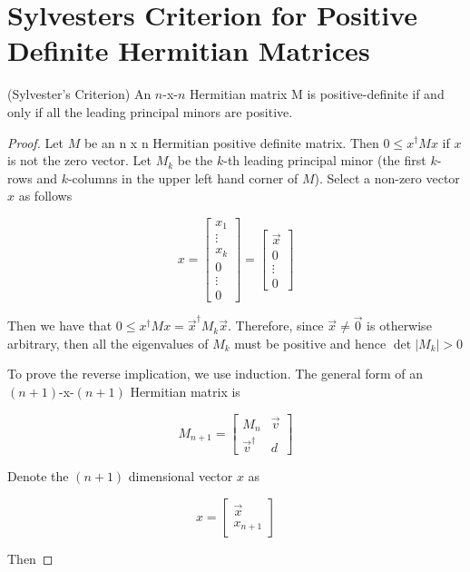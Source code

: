 \section{Sylvesters Criterion for Positive Definite Hermitian Matrices}

\begin{theorem} (Sylvester's Criterion)  An $n$-x-$n$ Hermitian matrix M is positive-definite if and only if all the leading principal minors are positive. 
\end{theorem}

\begin{proof}
Let $M$ be an n x n Hermitian positive definite matrix. Then $0 \le x^\dagger M x$ if $x$ is not the zero vector. Let $M_k$ be the $k$-th leading principal minor 
(the first $k$-rows and $k$-columns in the upper left hand corner of $M$). Select a non-zero vector $x$ as follows 

\[ x = 
\begin{bmatrix}
x_1 \\
\vdots \\
x_k\\
0\\
\vdots\\
0
\end{bmatrix}
= 
\begin{bmatrix}
\vec{x}\\
0\\
\vdots\\
0
\end{bmatrix}
\]

Then we have that $0 \le x^\dagger M x = \vec{x}^\dagger M_k \vec{x}$. Therefore, since $\vec{x} \ne \vec{0}$ is otherwise arbitrary, then all the eigenvalues of $M_k$ must be
positive and hence  $\det|M_k| > 0 $

To prove the reverse implication, we use induction. The general form of an $(n+1)$-x-$(n+1)$ Hermitian matrix is

\[ M_{n+1} = 
\begin{bmatrix}
M_n & \vec{v}\\
\vec{v}^\dagger & d
\end{bmatrix}
\]

Denote the $(n+1)$ dimensional vector $x$ as 

\[ x = 
\begin{bmatrix}
\vec{x} \\
x_{n+1}
\end{bmatrix}
\]

Then 


\end{proof}
